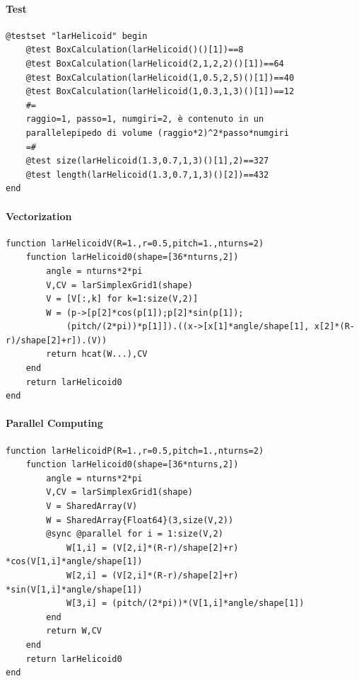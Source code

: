 \documentclass{article}
\begin{document}
\paragraph{Test}

\begin{Verbatim}
@testset "larHelicoid" begin
	@test BoxCalculation(larHelicoid()()[1])==8
	@test BoxCalculation(larHelicoid(2,1,2,2)()[1])==64
	@test BoxCalculation(larHelicoid(1,0.5,2,5)()[1])==40
	@test BoxCalculation(larHelicoid(1,0.3,1,3)()[1])==12
	#=
	raggio=1, passo=1, numgiri=2, è contenuto in un
	parallelepipedo di volume (raggio*2)^2*passo*numgiri
	=#
	@test size(larHelicoid(1.3,0.7,1,3)()[1],2)==327
	@test length(larHelicoid(1.3,0.7,1,3)()[2])==432
end
\end{Verbatim}

\paragraph{Vectorization}
\begin{Verbatim}
function larHelicoidV(R=1.,r=0.5,pitch=1.,nturns=2)
    function larHelicoid0(shape=[36*nturns,2])
        angle = nturns*2*pi
        V,CV = larSimplexGrid1(shape)
        V = [V[:,k] for k=1:size(V,2)]
        W = (p->[p[2]*cos(p[1]);p[2]*sin(p[1]);
            (pitch/(2*pi))*p[1]]).((x->[x[1]*angle/shape[1], x[2]*(R-r)/shape[2]+r]).(V))
        return hcat(W...),CV
    end
    return larHelicoid0    
end
\end{Verbatim}

\paragraph{Parallel Computing} 

\begin{Verbatim}
function larHelicoidP(R=1.,r=0.5,pitch=1.,nturns=2)
    function larHelicoid0(shape=[36*nturns,2])
        angle = nturns*2*pi
        V,CV = larSimplexGrid1(shape)
        V = SharedArray(V)
        W = SharedArray{Float64}(3,size(V,2))
        @sync @parallel for i = 1:size(V,2)
            W[1,i] = (V[2,i]*(R-r)/shape[2]+r) *cos(V[1,i]*angle/shape[1])
            W[2,i] = (V[2,i]*(R-r)/shape[2]+r) *sin(V[1,i]*angle/shape[1])
            W[3,i] = (pitch/(2*pi))*(V[1,i]*angle/shape[1])
        end
        return W,CV
    end
    return larHelicoid0    
end
\end{Verbatim}
\end{document}
